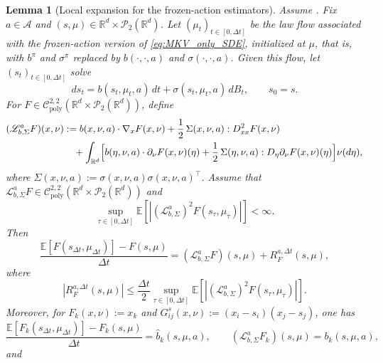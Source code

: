 \documentclass[a4paper, 10pt, english, reqno]{amsart}
\def\R{\mathbb R}
\newtheorem{lemma}[theorem]{Lemma}
\begin{document}
\begin{lemma}[Local expansion for the frozen-action estimators]
\label{lem:local-dynkin-expansion-frozen-action-mkv}
Assume . Fix $a\in\mathcal A$ and
$(s,\mu)\in\R^d\times\mathcal P_2(\R^d)$. Let
$(\mu_t)_{t\in[0,\Delta t]}$ be the law flow associated with the
frozen-action version of \eqref{eq:MKV_only_SDE}, initialized at $\mu$,
that is, with $b^\pi$ and $\sigma^\pi$ replaced by
$b(\cdot,\cdot,a)$ and $\sigma(\cdot,\cdot,a)$. Given this flow, let
$(s_t)_{t\in[0,\Delta t]}$ solve
\[
ds_t
=
b(s_t,\mu_t,a)\,dt
+
\sigma(s_t,\mu_t,a)\,dB_t,
\qquad
s_0=s.
\]
For $F\in\mathcal C^{2,2}_{\mathrm{poly}}
(\R^d\times\mathcal P_2(\R^d))$, define
\begin{equation}
\label{eq:frozen-action-generator-mkv}
\begin{aligned}
(\mathscr L_{b,\Sigma}^aF)(x,\nu)
&:=
b(x,\nu,a)\cdot\nabla_xF(x,\nu)
+\frac12\,\Sigma(x,\nu,a):D_{xx}^2F(x,\nu)
\\
&\quad+
\int_{\R^d}
\Bigl[
b(\eta,\nu,a)\cdot\partial_\nu F(x,\nu)(\eta)
+
\frac12\,\Sigma(\eta,\nu,a):D_\eta\partial_\nu F(x,\nu)(\eta)
\Bigr]\nu(d\eta),
\end{aligned}
\end{equation}
where $\Sigma(x,\nu,a):=\sigma(x,\nu,a)\sigma(x,\nu,a)^\top$.
Assume that $\mathscr L_{b,\Sigma}^aF\in
\mathcal C^{2,2}_{\mathrm{poly}}(\R^d\times\mathcal P_2(\R^d))$ and
\[
\sup_{\tau\in[0,\Delta t]}
\mathbb E\!\left[
|(\mathscr L_{b,\Sigma}^a)^2F(s_\tau,\mu_\tau)|
\right]<\infty .
\]
Then
\begin{equation}
\label{eq:local-expansion-general-mkv}
\frac{\mathbb E[F(s_{\Delta t},\mu_{\Delta t})]-F(s,\mu)}{\Delta t}
=
(\mathscr L_{b,\Sigma}^aF)(s,\mu)
+
R_F^{a,\Delta t}(s,\mu),
\end{equation}
where
\begin{equation}
\label{eq:local-expansion-remainder-mkv}
|R_F^{a,\Delta t}(s,\mu)|
\le
\frac{\Delta t}{2}
\sup_{\tau\in[0,\Delta t]}
\mathbb E\!\left[
|(\mathscr L_{b,\Sigma}^a)^2F(s_\tau,\mu_\tau)|
\right].
\end{equation}
Moreover, for $F_k(x,\nu):=x_k$ and
$G_{ij}^s(x,\nu):=(x_i-s_i)(x_j-s_j)$, one has
\begin{equation}
\label{eq:Fk-identities-mkv}
\frac{\mathbb E[F_k(s_{\Delta t},\mu_{\Delta t})]-F_k(s,\mu)}{\Delta t}
=
\hat b_k(s,\mu,a),
\qquad
(\mathscr L_{b,\Sigma}^aF_k)(s,\mu)=b_k(s,\mu,a),
\end{equation}
and
\begin{equation}

\end{equation}
\end{lemma}
\end{document}
